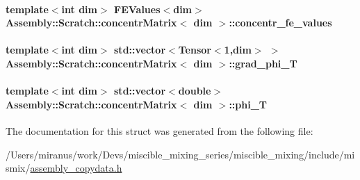 \paragraph[{concentr\+\_\+fe\+\_\+values}]{\setlength{\rightskip}{0pt plus 5cm}template$<$int dim$>$ F\+E\+Values$<$dim$>$ {\bf Assembly\+::\+Scratch\+::concentr\+Matrix}$<$ dim $>$\+::concentr\+\_\+fe\+\_\+values}\label{struct_assembly_1_1_scratch_1_1concentr_matrix_ab33eea0fdd2716aa1aab80e22a3c3d1b}
\hypertarget{struct_assembly_1_1_scratch_1_1concentr_matrix_a8a597e54b433d76d7e1f71b65b7155e5}{}
\paragraph[{grad\+\_\+phi\+\_\+\+T}]{\setlength{\rightskip}{0pt plus 5cm}template$<$int dim$>$ std\+::vector$<$Tensor$<$1,dim$>$ $>$ {\bf Assembly\+::\+Scratch\+::concentr\+Matrix}$<$ dim $>$\+::grad\+\_\+phi\+\_\+\+T}\label{struct_assembly_1_1_scratch_1_1concentr_matrix_a8a597e54b433d76d7e1f71b65b7155e5}
\hypertarget{struct_assembly_1_1_scratch_1_1concentr_matrix_a66a048dcc5601ac8bf72829c8a2eb567}{}
\paragraph[{phi\+\_\+\+T}]{\setlength{\rightskip}{0pt plus 5cm}template$<$int dim$>$ std\+::vector$<$double$>$ {\bf Assembly\+::\+Scratch\+::concentr\+Matrix}$<$ dim $>$\+::phi\+\_\+\+T}\label{struct_assembly_1_1_scratch_1_1concentr_matrix_a66a048dcc5601ac8bf72829c8a2eb567}


The documentation for this struct was generated from the following file\+:\begin{DoxyCompactItemize}
\item 
/\+Users/miranus/work/\+Devs/miscible\+\_\+mixing\+\_\+series/miscible\+\_\+mixing/include/mismix/\hyperlink{assembly__copydata_8h}{assembly\+\_\+copydata.\+h}\end{DoxyCompactItemize}
